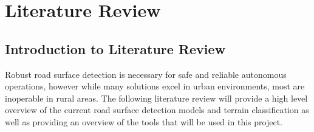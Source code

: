 \documentclass[numbered,pdftex]{ohio-etd}
\begin{document}
\chapter{Literature Review}{

	\section{Introduction to Literature Review}
		
		{Robust road surface detection is necessary for safe and reliable autonomous operations, however while many solutions excel in urban environments, most are inoperable in rural areas. The following literature review will provide a high level overview of the current road surface detection models and terrain classification as well as providing an overview of the tools that will be used in this project.}
		
}
\end{document}
